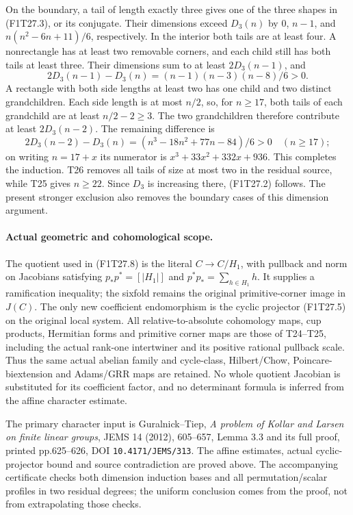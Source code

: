 On the boundary, a tail of length exactly three gives
one of the three shapes in (F1T27.3), or its conjugate.
Their dimensions exceed $D_3(n)$ by
$0$, $n-1$, and $n(n^2-6n+11)/6$, respectively.
In the interior both tails are at least four.
A nonrectangle has at least two removable corners,
and each child still has both tails at least three.
Their dimensions sum to at least $2D_3(n-1)$, and
\[
 2D_3(n-1)-D_3(n)=(n-1)(n-3)(n-8)/6>0.
\]
A rectangle with both side lengths at least two has
one child and two distinct grandchildren. Each side
length is at most $n/2$, so, for $n\ge17$, both tails
of each grandchild are at least $n/2-2\ge3$.
The two grandchildren therefore contribute at least
$2D_3(n-2)$. The remaining difference is
\[
 2D_3(n-2)-D_3(n)
       =(n^3-18n^2+77n-84)/6>0\quad(n\ge17);
\]
on writing $n=17+x$ its numerator is
$x^3+33x^2+332x+936$.
This completes the induction.
T26 removes all tails of size at most two in the
residual source, while T25 gives $n\ge22$.
Since $D_3$ is increasing there, (F1T27.2) follows.
The present stronger exclusion also removes the
boundary cases of this dimension argument.

\paragraph{Actual geometric and cohomological scope.}
The quotient used in (F1T27.8) is the literal
$C\to C/H_1$, with pullback and norm on Jacobians
satisfying $p_*p^*=[|H_1|]$ and
$p^*p_*=\sum_{h\in H_1}h$.
It supplies a ramification inequality; the sixfold
remains the original primitive-corner image in $J(C)$.
The only new coefficient endomorphism is the cyclic
projector (F1T27.5) on the original local system.
All relative-to-absolute cohomology maps, cup products,
Hermitian forms and primitive corner maps are those
of T24--T25, including the actual rank-one intertwiner
and its positive rational pullback scale.
Thus the same actual abelian family and cycle-class,
Hilbert/Chow, Poincare-biextension and Adams/GRR maps
are retained. No whole quotient Jacobian is substituted
for its coefficient factor, and no determinant formula
is inferred from the affine character estimate.

The primary character input is Guralnick--Tiep,
\emph{A problem of Kollar and Larsen on finite linear
groups}, JEMS 14 (2012), 605--657, Lemma 3.3 and its full
proof, printed pp.625--626, DOI \nolinkurl{10.4171/JEMS/313}.
The affine estimates, actual cyclic-projector bound
and source contradiction are proved above.
The accompanying certificate checks both dimension
induction bases and all permutation/scalar profiles
in two residual degrees; the uniform conclusion
comes from the proof, not from extrapolating those checks.
